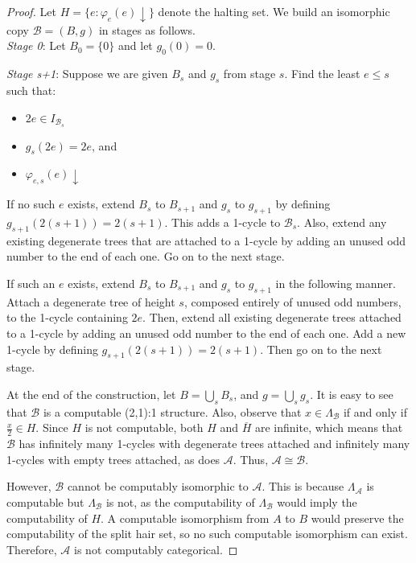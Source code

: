 \documentclass[12pt]{article}
\begin{document}
\begin{proof}
Let $H= \{e: \varphi_e(e)\downarrow\}$ denote the halting set. We build an isomorphic copy $\mathcal{B} = (B,g)$ in stages as follows.\\

\emph{Stage 0}: Let $B_0=\{0\}$ and let $g_0(0)=0$.

\emph{Stage s+1}: Suppose we are given $B_s$ and $g_s$ from stage $s$. Find the least $e \leq s$ such that:\\

\begin{itemize}
\item $2e \in I_{\mathcal{B}_s}$
\item $g_s(2e)=2e$, and
\item $\varphi_{e,s}(e)\downarrow$
\end{itemize}

If no such $e$ exists, extend $B_s$ to $B_{s+1}$ and $g_s$ to $g_{s+1}$ by defining $g_{s+1}(2(s+1))=2(s+1)$. This adds a 1-cycle to $\mathcal{B}_s$. Also, extend any existing degenerate trees that are attached to a 1-cycle by adding an unused odd number to the end of each one. Go on to the next stage.

If such an $e$ exists, extend $B_s$ to $B_{s+1}$ and $g_s$ to $g_{s+1}$ in the following manner. Attach a degenerate tree of height $s$, composed entirely of unused odd numbers, to the 1-cycle containing $2e$. Then, extend all existing degenerate trees attached to a 1-cycle by adding an unused odd number to the end of each one. Add a new 1-cycle by defining $g_{s+1}(2(s+1))=2(s+1)$. Then go on to the next stage. 

At the end of the construction, let $B = \bigcup_s B_s$, and $g=\bigcup_s g_s$. It is easy to see that $\mathcal{B}$ is a computable (2,1):1 structure. Also, observe that $x \in \Lambda_\mathcal{B}$ if and only if $\frac{x}{2} \in H$. Since $H$ is not computable, both $H$ and $\overline H$ are infinite, which means that $\mathcal{B}$ has infinitely many 1-cycles with degenerate trees attached and infinitely many 1-cycles with empty trees attached, as does $\mathcal{A}$. Thus, $\mathcal{A} \cong \mathcal{B}$.

However, $\mathcal{B}$ cannot be computably isomorphic to $\mathcal{A}$. This is because $\Lambda_\mathcal{A}$ is computable but $\Lambda_\mathcal{B}$ is not, as the computability of $\Lambda_\mathcal{B}$ would imply the computability of $H$. A computable isomorphism from $A$ to $B$ would preserve the computability of the split hair set, so no such computable isomorphism can exist. Therefore, $\mathcal{A}$ is not computably categorical.
\end{proof}
\end{document}
